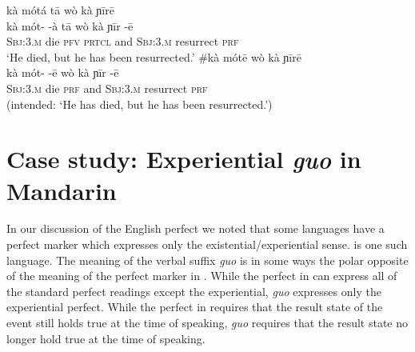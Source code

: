 \ea \label{ex:22.31}
\ea  \glll kà  mótá  {}  tā  wò  kà  ɲīrē\\
kà  mót-  -à  tā  wò  kà  ɲīr  -ē\\
\textsc{Sbj:3.m}  die  \textsc{pfv}  \textsc{prtcl}  and  \textsc{Sbj:3.m}  resurrect  \textsc{prf}\\
\glt ‘He died, but he has been resurrected.’
\ex \glll  \#kà  mótē  {}  wò  kà  ɲīrē\\
  kà  mót-  -ē  wò  kà  ɲīr  -ē\\
\textsc{Sbj:3.m}  die  \textsc{prf}  and  \textsc{Sbj:3.m}  resurrect  \textsc{prf}\\
\glt (intended: ‘He has died, but he has been resurrected.’)
\z \z

\section{Case study: Experiential \textit{guo} in Mandarin}\label{sec:22.6}

In our discussion of the English perfect we noted that some languages have a perfect marker which expresses only the existential/experiential sense.  is one such language. The meaning of the verbal suffix \textit{guo} is in some ways the polar opposite of the meaning of the perfect marker in . While the perfect in  can express all of the standard perfect readings except the experiential, \textit{guo} expresses only the experiential perfect. While the perfect in  requires that the result state of the event still holds true at the time of speaking, \textit{guo} requires that the result state no longer hold true at the time of speaking.



